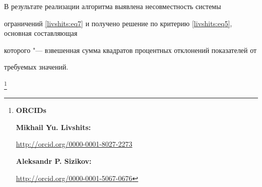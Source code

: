 В результате реализации алгоритма выявлена несовместность системы

ограничений \eqref{livshits:eq7} и получено решение по критерию \eqref{livshits:eq5}, основная составляющая

которого "--- взвешенная сумма квадратов процентных отклонений показателей от

требуемых значений.















\thanks{{\bf ORCIDs}



{\bf Mikhail Yu. Livshits:}

\url{http://orcid.org/0000-0001-8027-2273}



{\bf Aleksandr P. Sizikov:}

\url{http://orcid.org/0000-0001-5067-0676}





}























